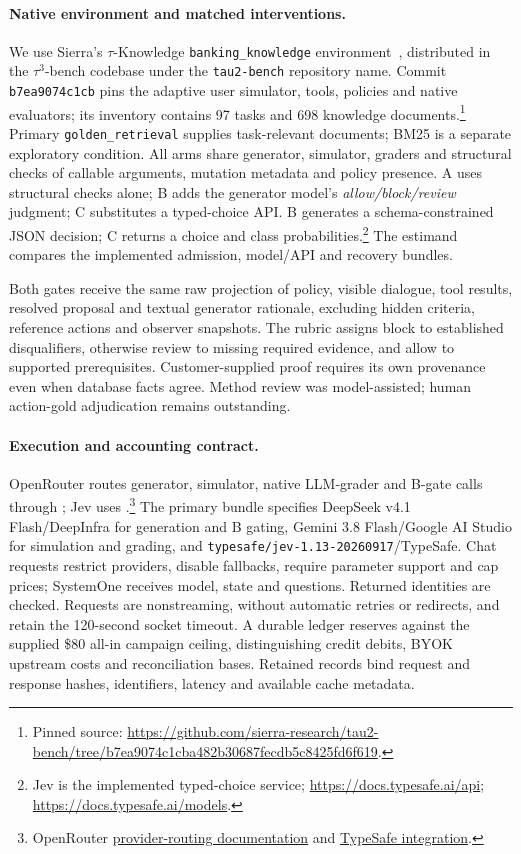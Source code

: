 \paragraph{Native environment and matched interventions.}
We use Sierra's $\tau$-Knowledge \texttt{banking\_knowledge}
environment~\citep{shi2026tauknowledge}, distributed in the $\tau^3$-bench
codebase under the \texttt{tau2-bench} repository name. Commit
\texttt{b7ea9074c1cb} pins the adaptive user simulator, tools, policies and
native evaluators; its inventory contains 97 tasks and 698 knowledge
documents.\footnote{Pinned source:
\url{https://github.com/sierra-research/tau2-bench/tree/b7ea9074c1cba482b30687fecdb5c8425fd6f619}.}
Primary \texttt{golden\_retrieval} supplies task-relevant documents; BM25 is
a separate exploratory condition. All arms share generator, simulator,
graders and structural checks of callable arguments, mutation metadata and
policy presence. A uses structural checks alone; B adds the generator
model's \emph{allow/block/review} judgment; C substitutes a typed-choice
API. B generates a schema-constrained JSON decision; C returns a choice and
class probabilities.\footnote{Jev is the implemented typed-choice service;
\url{https://docs.typesafe.ai/api}; \url{https://docs.typesafe.ai/models}.}
The estimand compares the implemented admission, model/API and recovery bundles.

Both gates receive the same raw projection of policy, visible dialogue, tool
results, resolved proposal and textual generator rationale, excluding hidden
criteria, reference actions and observer snapshots. The rubric assigns block
to established disqualifiers, otherwise review to missing required evidence,
and allow to supported prerequisites. Customer-supplied proof requires its
own provenance even when database facts agree. Method review was
model-assisted; human action-gold adjudication remains outstanding.

\paragraph{Execution and accounting contract.}
OpenRouter routes generator, simulator, native LLM-grader and B-gate calls
through ; Jev uses
.\footnote{OpenRouter
\href{https://openrouter.ai/docs/guides/routing/provider-selection}{provider-routing documentation}
and \href{https://openrouter.ai/docs/guides/community/typesafe-sdk}{TypeSafe integration}.}
The primary bundle specifies DeepSeek v4.1 Flash/DeepInfra for generation
and B gating, Gemini 3.8 Flash/Google AI Studio for simulation and grading,
and \texttt{typesafe/jev-1.13-20260917}/TypeSafe. Chat requests restrict
providers, disable fallbacks, require parameter support and cap prices;
SystemOne receives model, state and questions. Returned identities are
checked. Requests are nonstreaming, without automatic retries or redirects,
and retain the 120-second socket timeout. A durable ledger reserves against
the supplied \$80 all-in campaign ceiling, distinguishing credit debits,
BYOK upstream costs and reconciliation bases. Retained records bind request
and response hashes, identifiers, latency and available cache metadata.

